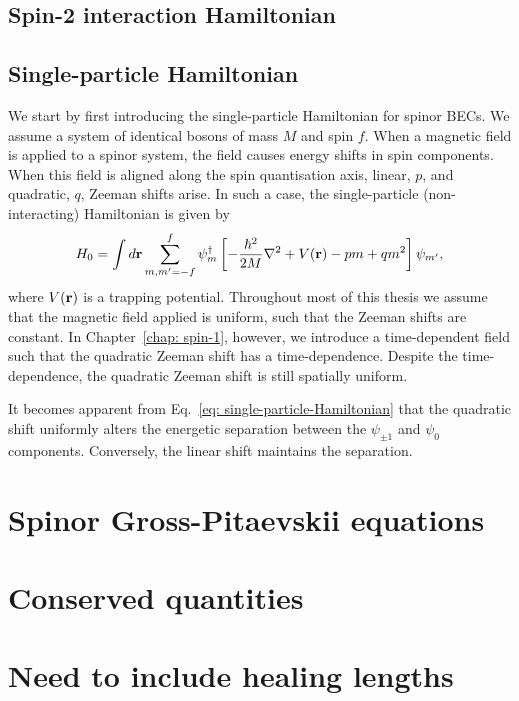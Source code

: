 \subsection{Spin-2 interaction Hamiltonian}

\subsection{Single-particle Hamiltonian}
We start by first introducing the single-particle Hamiltonian for spinor BECs.
We assume a system of identical bosons of mass \(M\) and spin \(f\).
When a magnetic field is applied to a spinor system, the field causes energy
shifts in spin components.
When this field is aligned along the spin quantisation axis, linear, \(p\), and
quadratic, \(q\), Zeeman shifts arise.
In such a case, the single-particle (non-interacting) Hamiltonian is given
by~\cite{Kawaguchi2012}
\begin{equation}\label{eq: single-particle-Hamiltonian}
    H_0 = \int d\vb{r}\sum_{m,m'=-f}^{f} \psi_m^\dagger \left[
        -\frac{\hbar^2}{2M}\nabla^2 + V(\vb{r}) - pm + qm^2\right]\psi_{m'},
\end{equation}
where \(V(\vb{r})\) is a trapping potential.
Throughout most of this thesis we assume that the magnetic field applied is
uniform, such that the Zeeman shifts are constant.
In Chapter~\ref{chap: spin-1}, however, we introduce a time-dependent field
such that the quadratic Zeeman shift has a time-dependence.
Despite the time-dependence, the quadratic Zeeman shift is still spatially
uniform.

It becomes apparent from Eq.~\eqref{eq: single-particle-Hamiltonian} that the
quadratic shift uniformly alters the energetic separation between the
\(\psi_{\pm 1}\) and \(\psi_0\) components.
Conversely, the linear shift maintains the separation.

\section{Spinor Gross-Pitaevskii equations}

\section{Conserved quantities}

\section{Need to include healing lengths}